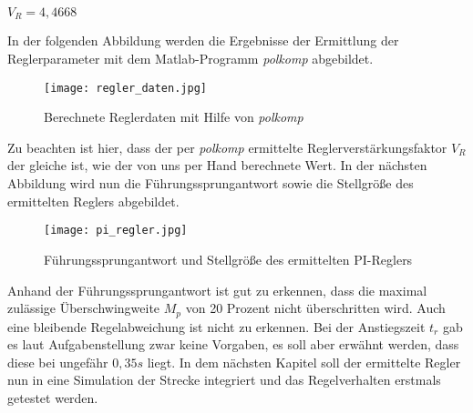 \begin{center}
$V_{R}=4,4668$
\end{center}

In der folgenden Abbildung werden die Ergebnisse der Ermittlung der Reglerparameter mit dem Matlab-Programm \textit{polkomp} abgebildet.

\newpage

\begin{figure}[h]
	\begin{center}
		\texttt{[image: regler\_daten.jpg]}
		\caption{Berechnete Reglerdaten mit Hilfe von \textit{polkomp}}
       \label{controllerData}
	\end{center} 
\end{figure}

Zu beachten ist hier, dass der per \textit{polkomp} ermittelte Reglerverstärkungsfaktor $V_{R}$ der gleiche ist, wie der von uns per Hand berechnete Wert. In der nächsten Abbildung wird nun die Führungssprungantwort sowie die Stellgröße des ermittelten Reglers abgebildet.

\newpage

\begin{figure}[h]
	\begin{center}
		\texttt{[image: pi\_regler.jpg]}
		\caption{Führungssprungantwort und Stellgröße des ermittelten PI-Reglers}
       \label{controller}
	\end{center} 
\end{figure}

Anhand der Führungssprungantwort ist gut zu erkennen, dass die maximal zulässige Überschwingweite $M_{p}$ von 20 Prozent nicht überschritten wird. Auch eine bleibende Regelabweichung ist nicht zu erkennen. Bei der Anstiegszeit $t_{r}$ gab es laut Aufgabenstellung zwar keine Vorgaben, es soll aber erwähnt werden, dass diese bei ungefähr $0,35s$ liegt. In dem nächsten Kapitel soll der ermittelte Regler nun in eine Simulation der Strecke integriert und das Regelverhalten erstmals getestet werden.


















